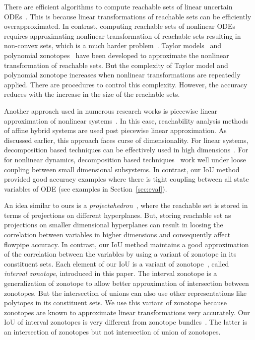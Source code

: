  There are efficient algorithms to compute reachable sets of linear
 uncertain
 ODEs~\cite{girard2005reachability,FLD+11,girard2008efficient,bak2017simulation}.
 This is because linear transformations of reachable sets can be
 efficiently overapproximated.  In contrast, computing reachable sets
 of nonlinear ODEs requires approximating nonlinear transformation of
 reachable sets resulting in non-convex sets, which is a much harder
 problem~\cite{dang2009image,monniaux2011generation}.  Taylor
 models~\cite{chen2012taylor} and polynomial
 zonotopes~\cite{althoff2013reachability,kochdumper2020sparse,kochdumper2020constrained}
 have been developed to approximate the nonlinear transformation of
 reachable sets.  But the complexity of Taylor model and polynomial
 zonotope increases when nonlinear transformations are repeatedly
 applied.  There are procedures to control this complexity. However,
 the accuracy reduces with the increase in the size of the reachable
 sets.

Another approach used in numerous research works is piecewise linear
approximation of nonlinear
systems~\cite{althoff2008reachability,li2020reachability,dang2010accurate,ramdani2009hybrid,han2006reachability,bak2016scalable}.
In this case, reachability analysis methods of affine hybrid systems
are used post piecewise linear approximation.  As discussed earlier,
this approach faces curse of dimensionality.  For linear systems,
decomposition based techniques can be effectively used in high
dimensions~\cite{bogomolov2018reach}.  For for nonlinear dynamics,
decomposition based
techniques~\cite{chen2018decomposition,chen2016decomposed} work well
under loose coupling between small dimensional subsystems.  In
contrast, our IoU method provided good accuracy examples where there
is tight coupling between all state variables of ODE (see examples in
Section~\ref{sec:eval}).  

An idea similar to ours is a
\emph{projectahedron}~\cite{greenstreet1999reachability}, where the reachable
set is stored in terms of projections on different hyperplanes.  But,
storing reachable set as projections on smaller dimensional
hyperplanes can result in loosing the correlation between variables in
higher dimensions and consequently affect flowpipe accuracy.  In
contrast, our IoU method maintains a good approximation of the
correlation between the variables by using a variant of zonotope in
its constituent sets.
%
Each element of our IoU is a variant of
zonotope~\cite{girard2005reachability}, called \emph{interval
  zonotope}, introduced in this paper.  The interval zonotope is a
generalization of zonotope to allow better approximation of
intersection between zonotopes.  But the intersection of unions can
also use other representations like polytopes in its constituent sets.
We use this variant of zonotope because zonotopes are known to
approximate linear transformations very accurately.  Our IoU of
interval zonotopes is very different from zonotope
bundles~\cite{althoff2011zonotope}.  The latter is an intersection of
zonotopes but not intersection of union of zonotopes.

